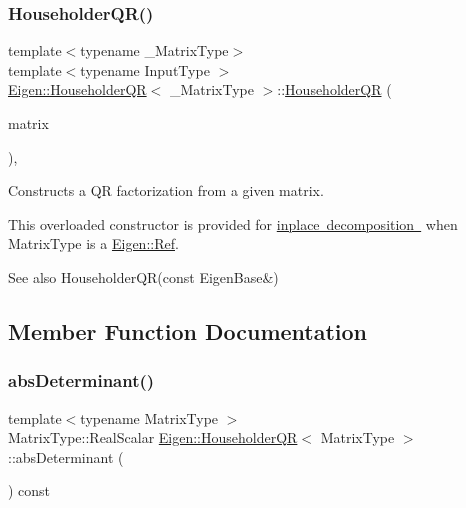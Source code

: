 \subsubsection{\texorpdfstring{HouseholderQR()}{HouseholderQR()}\hspace{0.1cm}{\footnotesize\ttfamily [4/4]}}
{\footnotesize\ttfamily template$<$typename \+\_\+\+Matrix\+Type$>$ \\
template$<$typename Input\+Type $>$ \\
\mbox{\hyperlink{class_eigen_1_1_householder_q_r}{Eigen\+::\+Householder\+QR}}$<$ \+\_\+\+Matrix\+Type $>$\+::\mbox{\hyperlink{class_eigen_1_1_householder_q_r}{Householder\+QR}} (\begin{DoxyParamCaption}\item[{\mbox{\hyperlink{struct_eigen_1_1_eigen_base}{Eigen\+Base}}$<$ Input\+Type $>$ \&}]{matrix }\end{DoxyParamCaption})\hspace{0.3cm}{\ttfamily [inline]}, {\ttfamily [explicit]}}



Constructs a QR factorization from a given matrix. 

This overloaded constructor is provided for \mbox{\hyperlink{}{inplace decomposition }} when {\ttfamily Matrix\+Type} is a \mbox{\hyperlink{class_eigen_1_1_ref}{Eigen\+::\+Ref}}.

\begin{DoxySeeAlso}{See also}
Householder\+Q\+R(const Eigen\+Base\&) 
\end{DoxySeeAlso}


\subsection{Member Function Documentation}
\mbox{\label{class_eigen_1_1_householder_q_r_aaf4ef26c0b7affc91431ec59c92d64c3}} 
\subsubsection{\texorpdfstring{absDeterminant()}{absDeterminant()}}
{\footnotesize\ttfamily template$<$typename Matrix\+Type $>$ \\
Matrix\+Type\+::\+Real\+Scalar \mbox{\hyperlink{class_eigen_1_1_householder_q_r}{Eigen\+::\+Householder\+QR}}$<$ Matrix\+Type $>$\+::abs\+Determinant (\begin{DoxyParamCaption}{ }\end{DoxyParamCaption}) const}

